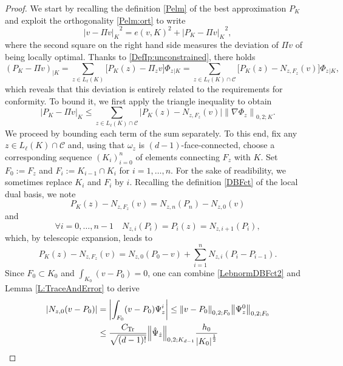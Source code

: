 \documentclass[a4paper]{amsart}
\numberwithin{equation}{section}
\theoremstyle{plain}
\theoremstyle{definition}
\begin{document}
\begin{proof}
We start by recalling the definition \eqref{Pelm} of the best approximation 
$P_{K}$ and exploit the orthogonality \eqref{Pelm:ort} to write
\[
 {\left|{v - {\Pi} v}\right|_{K}}^2
 =
 e(v,{K})^2 
 +
 {\left|{P_{K} - {\Pi} v}\right|_{K}}^2,
\]
where the second square on the right hand side measures the deviation of ${\Pi} 
v$ of being locally optimal.  Thanks to \eqref{DefIp:unconstrained}, there holds
\[
 (P_{K} - {\Pi} v)_{|{K}}
 =
 \sum_{z\in{L_{{\ell}}}({K})}
  \big[ P_{K}(z) - {\Pi}_z v \big] {\Phi}_z{}_{|{K}}
 =
 \sum_{z\in{L_{{\ell}}}({K})\cap{\mathcal{C}}}
  \big[ P_{K}(z) - {N}_{z,{F}_z}(v) \big] {\Phi}_z{}_{|{K}},
\]
which reveals that this deviation is entirely related to the requirements for 
conformity.  To bound it, we first apply the triangle inequality to obtain
\begin{equation}
\label{CplngErr}
 {\left|{P_{K} - {\Pi} v}\right|_{K}}
 \leq
  \sum_{z\in{L_{{\ell}}}({K})\cap{\mathcal{C}}}
  \big| P_{K}(z) - {N}_{z,{F}_z}(v) \big|
   {{\left\|{{{\nabla}{\Phi}_z}}\right\|_{{0,2;{K}}}}}.
\end{equation}
We proceed by bounding each term of the sum separately.  To this end,
fix any $z\in{L_{{\ell}}}({K})\cap{\mathcal{C}}$ and, using that
$\omega_z$ is $(d-1)$-face-connected, choose a corresponding sequence
$({K}_i)_{i=0}^n$ of elements connecting ${F}_z$ with ${K}$.  Set
${F}_0{:=}{F}_z$ and ${F}_i{:=}{K}_{i-1}\cap{K}_i$ for
$i=1,\dots,n$.  For the sake of readibility, we sometimes replace
${K}_i$ and ${F}_i$ by $i$.  Recalling the definition \eqref{DBFct}
of the local dual basis, we note
\[
 P_{K}(z)-{N}_{z,{F}_z}(v)
 =
 {N}_{z,n}(P_n)-{N}_{z,0}(v)
\]
and
\[
 \forall i=0,\dots,n-1
\quad
 {N}_{z,i}(P_i)
 =
 P_i(z)
 =
 {N}_{z,i+1}(P_i),
\]
which, by telescopic expansion, leads to
\begin{equation}
\label{Telescopic}
 P_{K}(z)-{N}_{z,{F}_z}(v)
 =
 {N}_{z,0}(P_0-v)
 +
 \sum_{i=1}^n {N}_{z,i}(P_i-P_{i-1}).
\end{equation}
Since ${F}_0\subset{K}_0$ and $\int_{{K}_0} (v-P_0) = 0$, one can
combine \eqref{LebnormDBFct2} and Lemma \ref{L:TraceAndError} to
derive
\begin{align*}
 |{N}_{z,0}(v-P_0)|
 &=
 \left|
  \int_{{F}_0} (v-P_0) {\Psi}^i_z
 \right|
 \leq
 {{\left\|{{v-P_0}}\right\|_{{0,2;{{F}_0}}}}} {{\left\|{{{\Psi}^0_z}}\right\|_{{0,2;{{F}_0}}}}}
\\
 &\leq
 \frac{{C_\text{Tr}}}{\sqrt{(d-1)!}}
 {{\left\|{{\Hat{\Psi}_{\Hat z}}}\right\|_{{0,2;{{K}_{d-1}}}}}}
 \frac{h_{0}}{{\left|{{K}_0}\right|}^{\frac12}}

\end{align*}
\end{proof}
\end{document}
